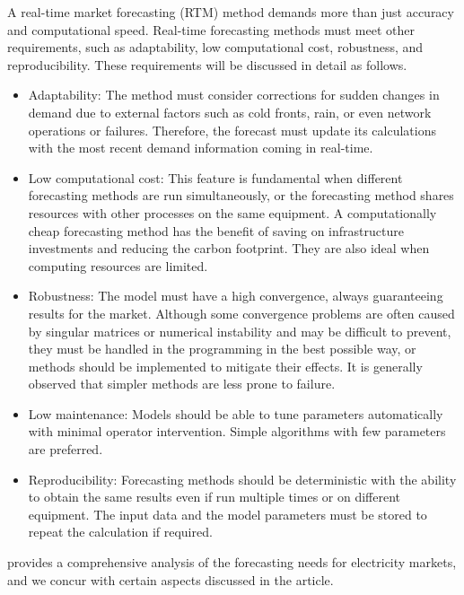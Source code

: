 
A real-time market forecasting (RTM) method demands more than just accuracy and computational speed. Real-time forecasting methods must meet other requirements, such as adaptability, low computational cost, robustness, and reproducibility. These requirements will be discussed in detail as follows.

\begin{itemize}
\item Adaptability: The method must consider corrections for sudden changes in demand due to external factors such as cold fronts, rain, or even network operations or failures. Therefore, the forecast must update its calculations with the most recent demand information coming in real-time. 
    \item Low computational cost: This feature is fundamental when different forecasting methods are run simultaneously, or the forecasting method shares resources with other processes on the same equipment. A computationally cheap forecasting method has the benefit of saving on infrastructure investments and reducing the carbon footprint. They are also ideal when computing resources are limited.
    \item Robustness: The model must have a high convergence, always guaranteeing results for the market. Although some convergence problems are often caused by singular matrices or numerical instability and may be difficult to prevent, they must be handled in the programming in the best possible way, or methods should be implemented to mitigate their effects. It is generally observed that simpler methods are less prone to failure.
    \item Low maintenance: Models should be able to tune parameters automatically with minimal operator intervention. Simple algorithms with few parameters are preferred.
    \item Reproducibility: Forecasting methods should be deterministic with the ability to obtain the same results even if run multiple times or on different equipment. The input data and the model parameters must be stored to repeat the calculation if required.
\end{itemize}

\citet{Dannecker2015} provides a comprehensive analysis of the forecasting needs for electricity markets, and we concur with certain aspects discussed in the article.

